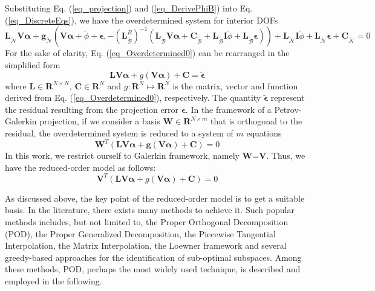 \documentclass[preprint, 10pt]{elsarticle}
\begin{document}
Substituting Eq. (\ref{eq_projection}) and (\ref{eq_DerivePhiB}) into Eq. (\ref{eq_DiscreteEqs}), we have the overdetermined system for interior
DOFs
\begin{equation}
\mathbf{L}_{\widetilde {\mathcal{N}}} \mathbf{V} \pmb{\alpha}
+\mathbf{g}_{\widetilde {\mathcal{N}}}
\left( \mathbf{V} \pmb{\alpha} + \tilde{\phi} + \pmb{\epsilon}, -\left( \mathbf{L}_{\widetilde {\mathcal{B}}}^{B} \right)^{-1}
\left(
\mathbf{L}_{\widetilde {\mathcal{B}}} \mathbf{V} \pmb{\alpha} +
\mathbf{C}_{\widetilde {\mathcal{B}}} + \mathbf{L}_{\widetilde {\mathcal{B}}} \mathbf{I} \tilde{\phi} + \mathbf{L}_{\widetilde {\mathcal{B}}} \pmb{\epsilon}
\right) \right)
+\mathbf{L}_{\widetilde {\mathcal{N}}} \mathbf{I} \tilde{\phi}
+\mathbf{L}_{\widetilde {\mathcal{N}}} \pmb{\epsilon}
+ \mathbf{C}_{\widetilde {\mathcal{N}}}
= 0
\label{eq_Overdetermined0}
\end{equation}
For the sake of clarity, Eq. (\ref{eq_Overdetermined0}) can be rearranged in the simplified form
\begin{equation}
 \mathbf{L} \mathbf{V} \pmb{\alpha}
+ g         \left( \mathbf{V} \pmb{\alpha} \right)
+\mathbf{C}
= \tilde{ \pmb{\epsilon} }
\label{eq_Overdetermined1}
\end{equation}
where $\mathbf{L} \in \mathbf{R}^{N \times N}$, $\mathbf{C} \in \mathbf{R}^{N}$ and $g: \mathbf{R}^N \mapsto \mathbf{R}^N$ is the matrix, vector and function derived from Eq. (\ref{eq_Overdetermined0}), respectively.
The quantity $\tilde{ \pmb{\epsilon} }$ represent the residual resulting from the projection error $\pmb{\epsilon}$.
In the framework of a Petrov-Galerkin projection, if we consider a basis $\mathbf{W} \in \mathbf{R}^{N \times m}$ that is orthogonal to the residual,  the overdetermined system is reduced to a system of $m$ equations
\begin{equation}
\mathbf{W}^T
\left(
 \mathbf{L} \mathbf{V} \pmb{\alpha}
+\mathbf{g} \left( \mathbf{V} \pmb{\alpha} \right)
+\mathbf{C}
\right)
=0
\label{eq_Petrov}
\end{equation}
In this work, we restrict ourself to Galerkin framework, namely $\mathbf{W}$=$\mathbf{V}$.
Thus, we have the reduced-order model as follows:
\begin{equation}
\mathbf{V}^T
\left(
 \mathbf{L} \mathbf{V} \pmb{\alpha}
+ g         \left( \mathbf{V} \pmb{\alpha} \right)
+\mathbf{C}
\right)
=0
\label{eq_Galerkin}
\end{equation}

As discussed above, the key point of the reduced-order model is to get a suitable basis. In the literature, there exists many methods to achieve it. Such popular methods includes, but not limited to, the Proper Orthogonal Decomposition (POD), the Proper Generalized Decomposition, the Piecewise Tangential Interpolation, the Matrix Interpolation, the Loewner framework and several greedy-based approaches for the identification of sub-optimal subspaces. Among these methods, POD, perhaps the most widely used technique, is described and employed in the following.
\end{document}
